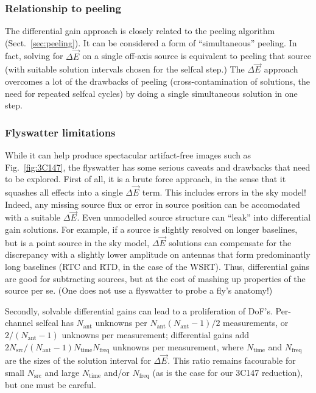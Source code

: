 \documentclass[]{aa}
\newcommand{\jones}[2]{\vec {#1}_{#2}}
\begin{document}
\subsubsection{Relationship to peeling}

The differential gain approach is closely related to the peeling algorithm (Sect.~\ref{sec:peeling}). It can be considered a form of ``simultaneous'' peeling. In fact, solving for $\Delta\jones{E}{}$ on a single off-axis source is equivalent to peeling that source (with suitable solution intervals chosen for the selfcal step.) The $\Delta\jones{E}{}$ approach overcomes a lot of the drawbacks of peeling (cross-contamination of solutions, the need for repeated selfcal cycles) by doing a single simultaneous solution in one step.

\subsubsection{Flyswatter limitations}

While it can help produce spectacular artifact-free images such as Fig.~\ref{fig:3C147}, the flyswatter has some serious caveats and drawbacks that need to be explored. First of all, it is a brute force approach, in the sense that it squashes all effects into a single $\Delta\jones{E}{}$ term. This includes errors in the sky model! Indeed, any missing source flux or error in source position can be accomodated with a suitable $\Delta\jones{E}{}$. Even unmodelled source structure can ``leak'' into differential gain solutions. For example, if a source is slightly resolved on longer baselines, but is a point source in the sky model, $\Delta\jones{E}{}$ solutions can compensate for the discrepancy with a slightly lower amplitude on antennas that form predominantly long baselines (RTC and RTD, in the case of the WSRT). Thus, differential gains are good for subtracting sources, but at the cost of mashing up properties of the source per se. (One does not use a flyswatter to probe a fly's anatomy!)

Secondly, solvable differential gains can lead to a proliferation of DoF's. Per-channel selfcal has $N_\mathrm{ant}$ unknowns per $N_\mathrm{ant}(N_\mathrm{ant}-1)/2$ measurements, or $2/(N_\mathrm{ant}-1)$ unknowns per measurement; differential gains add $2N_\mathrm{src}/(N_\mathrm{ant}-1)N_\mathrm{time}N_\mathrm{freq}$ unknowns per measurement, where $N_\mathrm{time}$ and $N_\mathrm{freq}$ are the sizes of the solution interval for $\Delta\jones{E}{}$. This ratio remains facourable for small $N_\mathrm{src}$ and large $N_\mathrm{time}$ and/or $N_\mathrm{freq}$ (as is the case for our 3C147 reduction), but one must be careful.
\end{document}
